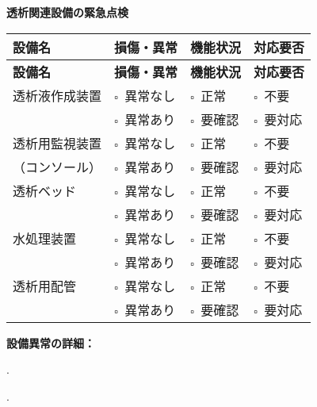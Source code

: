 \documentclass[a4paper,12pt]{jarticle}
\newcommand{\checkbox}{$\square$\ }
\newcommand{\underlinespace}[1]{\underline{\hspace{#1}}}
\begin{document}
\vspace{8mm}

\begin{center}
\textbf{\large 透析関連設備の緊急点検}
\end{center}

\vspace{3mm}

\begin{longtable}{|p{4cm}|p{2.5cm}|p{2.5cm}|p{3cm}|}
\hline
\textbf{設備名} & \textbf{損傷・異常} & \textbf{機能状況} & \textbf{対応要否} \\
\hline
\endfirsthead
\hline
\textbf{設備名} & \textbf{損傷・異常} & \textbf{機能状況} & \textbf{対応要否} \\
\hline
\endhead
透析液作成装置 & \checkbox 異常なし & \checkbox 正常 & \checkbox 不要 \\
               & \checkbox 異常あり & \checkbox 要確認 & \checkbox 要対応 \\[0.3cm]
\hline
透析用監視装置 & \checkbox 異常なし & \checkbox 正常 & \checkbox 不要 \\
（コンソール） & \checkbox 異常あり & \checkbox 要確認 & \checkbox 要対応 \\[0.3cm]
\hline
透析ベッド & \checkbox 異常なし & \checkbox 正常 & \checkbox 不要 \\
           & \checkbox 異常あり & \checkbox 要確認 & \checkbox 要対応 \\[0.3cm]
\hline
水処理装置 & \checkbox 異常なし & \checkbox 正常 & \checkbox 不要 \\
           & \checkbox 異常あり & \checkbox 要確認 & \checkbox 要対応 \\[0.3cm]
\hline
透析用配管 & \checkbox 異常なし & \checkbox 正常 & \checkbox 不要 \\
           & \checkbox 異常あり & \checkbox 要確認 & \checkbox 要対応 \\[0.3cm]
\hline
\end{longtable}

\vspace{3mm}

\noindent
\textbf{設備異常の詳細：}

\vspace{2mm}

. \underlinespace{12cm}

\vspace{2mm}

. \underlinespace{12cm}

\vspace{2mm}
\end{document}
